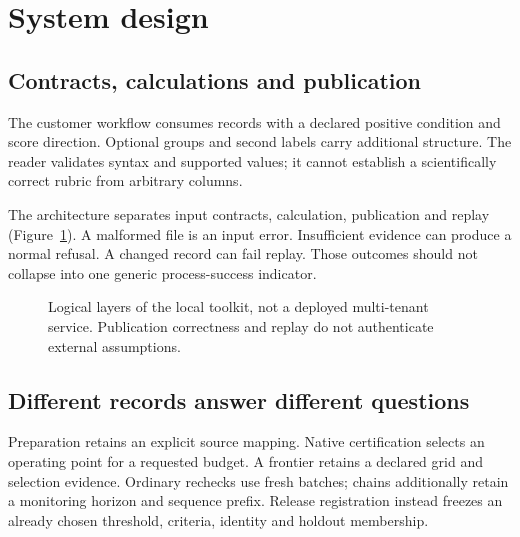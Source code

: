 \section{System design}
\subsection{Contracts, calculations and publication}
The customer workflow consumes  records with a declared
positive condition and score direction. Optional groups and second labels carry
additional structure. The reader validates syntax and supported values; it
cannot establish a scientifically correct rubric from arbitrary columns.

The architecture separates input contracts, calculation, publication and replay
(Figure~\ref{fig:architecture}). A malformed file is an input error. Insufficient
evidence can produce a normal refusal. A changed record can fail replay. Those
outcomes should not collapse into one generic process-success indicator.

\begin{figure}[htbp]
\centering
{}
\caption{Logical layers of the local toolkit, not a deployed multi-tenant
service. Publication correctness and replay do not authenticate external
assumptions.}
\label{fig:architecture}
\end{figure}

\subsection{Different records answer different questions}
Preparation retains an explicit source mapping. Native certification selects an
operating point for a requested budget. A frontier retains a declared grid and
selection evidence. Ordinary rechecks use fresh batches; chains additionally
retain a monitoring horizon and sequence prefix. Release registration instead
freezes an already chosen threshold, criteria, identity and holdout membership.

